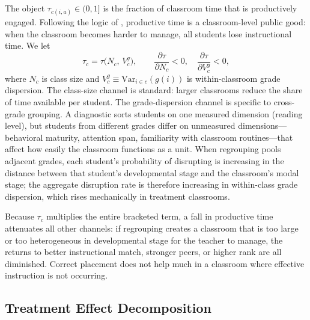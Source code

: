 \documentclass[11pt]{article}
\begin{document}
The object $\tau_{c(i,a)} \in (0, 1]$ is the fraction of classroom time that is productively engaged. Following the logic of \citet{Lazear2001}, productive time is a classroom-level public good: when the classroom becomes harder to manage, all students lose instructional time. We let
\begin{equation}
\label{eq:tau}
\tau_c = \tau\!\big(N_c,\, V^g_c\big), \qquad \frac{\partial\tau}{\partial N_c} < 0, \quad \frac{\partial\tau}{\partial V^g_c} < 0,
\end{equation}
where $N_c$ is class size and $V^g_c \equiv \text{Var}_{i \in c}(g(i))$ is within-classroom grade dispersion. The class-size channel is standard: larger classrooms reduce the share of time available per student. The grade-dispersion channel is specific to cross-grade grouping. A diagnostic sorts students on one measured dimension (reading level), but students from different grades differ on unmeasured dimensions---behavioral maturity, attention span, familiarity with classroom routines---that affect how easily the classroom functions as a unit. When regrouping pools adjacent grades, each student's probability of disrupting is increasing in the distance between that student's developmental stage and the classroom's modal stage; the aggregate disruption rate is therefore increasing in within-class grade dispersion, which rises mechanically in treatment classrooms.

Because $\tau_c$ multiplies the entire bracketed term, a fall in productive time attenuates all other channels: if regrouping creates a classroom that is too large or too heterogeneous in developmental stage for the teacher to manage, the returns to better instructional match, stronger peers, or higher rank are all diminished. Correct placement does not help much in a classroom where effective instruction is not occurring.

\subsection{Treatment Effect Decomposition}
\end{document}
